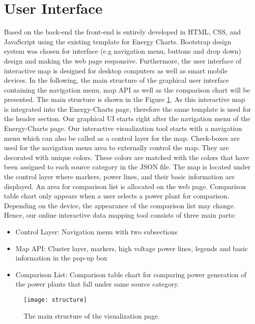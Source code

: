 \section{User Interface}
\label{sec:ui}

Based on the back-end the front-end is entirely developed in HTML, CSS, and JavaScript using the existing template for Energy Charts. Bootstrap design system was chosen for interface (e.g navigation menu, buttons and drop down) design and making the web page responsive. Furthermore, the user interface of interactive map is designed for desktop computers as well as smart mobile devices. In the following, the main structure of the graphical user interface containing the navigation menu, map API as well as the comparison chart will be presented. The main structure is shown in the Figure \ref{fig:structure}. As this interactive map is integrated into the Energy-Charts page, therefore the same template is used for the header section. Our graphical UI starts right after the navigation menu of the Energy-Charts page. Our interactive visualization tool starts with a navigation menu which can also be called as a control layer for the map. Check-boxes are used for the navigation menu area to externally control the map. They are decorated with unique colors. These colors are matched with the colors that have been assigned to each source category in the JSON file.  The map is located under the control layer where markers, power lines, and their basic information are displayed. An area for comparison list is allocated on the web page. Comparison table chart only appears when a user selects a power plant for comparison. Depending on the device, the appearance of the comparison list may change. Hence, our online interactive data mapping tool consists of three main parts: 

\begin{itemize}
	\item{Control Layer: Navigation menu with two subsections}
	\item{Map API: Cluster layer, markers, high voltage power lines, legends and basic information in the pop-up box}
	\item{Comparison List: Comparison table chart for comparing power generation of the power plants that fall under same source category.}
\end{itemize}

\begin{figure}
  \begin{center}
    \texttt{[image: structure]}
    \caption{The main structure of the visualization page.}
    \label{fig:structure}
  \end{center}
\end{figure}

